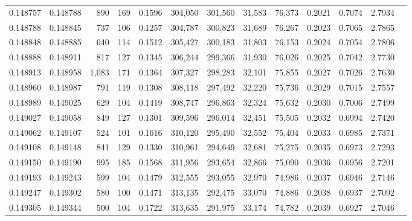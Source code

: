 \begin{tabular}{rrrrrrrrrrrrr}
0.148757 & 0.148788 &   890 & 169 &                                     0.1596 & 304,050 & 301,560 &  31,583 &  76,373 & 0.2021 & 0.7074 & 2.7934 \\
0.148788 & 0.148845 &   737 & 106 &                                     0.1257 & 304,787 & 300,823 &  31,689 &  76,267 & 0.2023 & 0.7065 & 2.7865 \\
0.148848 & 0.148885 &   640 & 114 &                                     0.1512 & 305,427 & 300,183 &  31,803 &  76,153 & 0.2024 & 0.7054 & 2.7806 \\
0.148888 & 0.148911 &   817 & 127 &                                     0.1345 & 306,244 & 299,366 &  31,930 &  76,026 & 0.2025 & 0.7042 & 2.7730 \\
0.148913 & 0.148958 & 1,083 & 171 &                                     0.1364 & 307,327 & 298,283 &  32,101 &  75,855 & 0.2027 & 0.7026 & 2.7630 \\
0.148960 & 0.148987 &   791 & 119 &                                     0.1308 & 308,118 & 297,492 &  32,220 &  75,736 & 0.2029 & 0.7015 & 2.7557 \\
0.148989 & 0.149025 &   629 & 104 &                                     0.1419 & 308,747 & 296,863 &  32,324 &  75,632 & 0.2030 & 0.7006 & 2.7499 \\
0.149027 & 0.149058 &   849 & 127 &                                     0.1301 & 309,596 & 296,014 &  32,451 &  75,505 & 0.2032 & 0.6994 & 2.7420 \\
0.149062 & 0.149107 &   524 & 101 &                                     0.1616 & 310,120 & 295,490 &  32,552 &  75,404 & 0.2033 & 0.6985 & 2.7371 \\
0.149108 & 0.149148 &   841 & 129 &                                     0.1330 & 310,961 & 294,649 &  32,681 &  75,275 & 0.2035 & 0.6973 & 2.7293 \\
0.149150 & 0.149190 &   995 & 185 &                                     0.1568 & 311,956 & 293,654 &  32,866 &  75,090 & 0.2036 & 0.6956 & 2.7201 \\
0.149193 & 0.149243 &   599 & 104 &                                     0.1479 & 312,555 & 293,055 &  32,970 &  74,986 & 0.2037 & 0.6946 & 2.7146 \\
0.149247 & 0.149302 &   580 & 100 &                                     0.1471 & 313,135 & 292,475 &  33,070 &  74,886 & 0.2038 & 0.6937 & 2.7092 \\
0.149305 & 0.149344 &   500 & 104 &                                     0.1722 & 313,635 & 291,975 &  33,174 &  74,782 & 0.2039 & 0.6927 & 2.7046 \\

\end{tabular}
